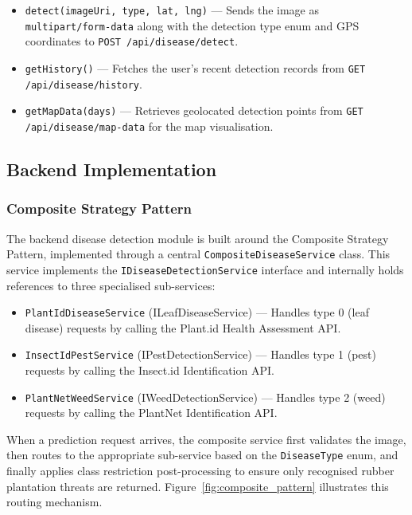\begin{itemize}
    \item \texttt{detect(imageUri, type, lat, lng)} --- Sends the image as \texttt{multipart/form-data} along with the detection type enum and GPS coordinates to \texttt{POST /api/disease/detect}.
    \item \texttt{getHistory()} --- Fetches the user's recent detection records from \texttt{GET /api/disease/history}.
    \item \texttt{getMapData(days)} --- Retrieves geolocated detection points from \texttt{GET /api/disease/map-data} for the map visualisation.
\end{itemize}


\subsection{Backend Implementation}

\subsubsection{Composite Strategy Pattern}

The backend disease detection module is built around the Composite Strategy Pattern, implemented through a central \texttt{CompositeDiseaseService} class. This service implements the \texttt{IDiseaseDetectionService} interface and internally holds references to three specialised sub-services:

\begin{itemize}
    \item \texttt{PlantIdDiseaseService} (ILeafDiseaseService) --- Handles type 0 (leaf disease) requests by calling the Plant.id Health Assessment API.
    \item \texttt{InsectIdPestService} (IPestDetectionService) --- Handles type 1 (pest) requests by calling the Insect.id Identification API.
    \item \texttt{PlantNetWeedService} (IWeedDetectionService) --- Handles type 2 (weed) requests by calling the PlantNet Identification API.
\end{itemize}

When a prediction request arrives, the composite service first validates the image, then routes to the appropriate sub-service based on the \texttt{DiseaseType} enum, and finally applies class restriction post-processing to ensure only recognised rubber plantation threats are returned. Figure~\ref{fig:composite_pattern} illustrates this routing mechanism.

